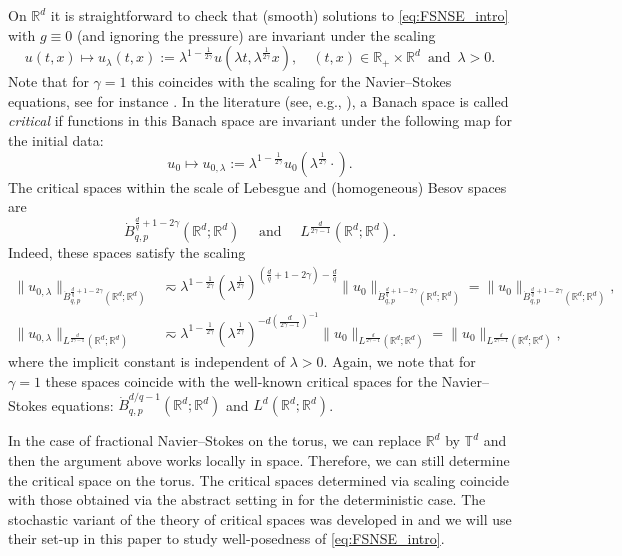\documentclass[11pt, a4paper,oneside, reqno]{amsart}
\theoremstyle{remark} %
\theoremstyle{definition} %
\numberwithin{theorem}{section}
\numberwithin{equation}{section}
\newcommand{\T}{\mathbb{T}}
\newcommand{\RR}{\mathbb{R}}
\newcommand{\RRd}{\RR^d}
\newcommand{\gam}{\gamma}
\begin{document}
On $\RR^d$ it is straightforward to check that (smooth) solutions to \eqref{eq:FSNSE_intro} with $g\equiv 0$ (and ignoring the pressure) are invariant under the scaling
\begin{equation*}
    u(t,x) \mapsto u_\lambda(t,x):= \lambda^{1-\frac{1}{2\gam}}u(\lambda t, \lambda^{\frac{1}{2\gam}}x), \quad (t,x)\in \RR_+\times \RR^d\, \text{ and }\, \lambda>0.
\end{equation*}
Note that for $\gam=1$ this coincides with the scaling for the Navier--Stokes equations, see for instance \cite{AV24_SNSE, PW18}. In the literature (see, e.g., \cite{AV25_survey, LR16, PW18, Tr13}), a Banach space is called \emph{critical} if functions in this Banach space are invariant under the following map for the initial data:
\begin{equation*}
   u_0\mapsto u_{0,\lambda} := \lambda^{1-\frac{1}{2\gam}}u_0(\lambda^{\frac{1}{2\gam}}\cdot).
\end{equation*}
The critical spaces within the scale of Lebesgue and (homogeneous) Besov spaces are
\begin{equation*}
    \dot{B}_{q,p}^{\frac{d}{q}+1-2\gam}(\RRd;\RRd)\quad \text{ and }\quad L^{\frac{d}{2\gam-1}}(\RRd;\RRd).
\end{equation*}
Indeed, these spaces satisfy the scaling
\begin{align*}
    \|u_{0,\lambda}\|_{\dot{B}_{q,p}^{\frac{d}{q}+1-2\gam}(\RRd;\RRd)}&\eqsim\lambda^{1-\frac{1}{2\gam}}(\lambda^{\frac{1}{2\gam}})^{(\frac{d}{q}+1-2\gam)-\frac{d}{q}}\|u_0\|_{\dot{B}_{q,p}^{\frac{d}{q}+1-2\gam}(\RRd;\RRd)} = \|u_0\|_{\dot{B}_{q,p}^{\frac{d}{q}+1-2\gam}(\RRd;\RRd)},\\
     \|u_{0,\lambda}\|_{L^{\frac{d}{2\gam-1}}(\RRd;\RRd)}&\eqsim \lambda^{1-\frac{1}{2\gam}} (\lambda^{\frac{1}{2\gam}})^{-d (\frac{d}{2\gam-1})^{-1}}\|u_0\|_{L^{\frac{d}{2\gam-1}}(\RRd;\RRd)} = \|u_0\|_{L^{\frac{d}{2\gam-1}}(\RRd;\RRd)},
\end{align*}
where the implicit constant is independent of $\lambda>0$. Again, we note that for $\gam=1$ these spaces coincide with the well-known critical spaces for the Navier--Stokes equations: $\dot{B}_{q,p}^{d/q-1}(\RRd;\RRd)$ and $L^d(\RRd;\RRd)$.

In the case of fractional Navier--Stokes on the torus, we can replace $\RRd$ by $\T^d$ and then the argument above works locally in space. Therefore, we can still determine the critical space on the torus. The critical spaces determined via scaling coincide with those obtained via the abstract setting in \cite{PSW18, PW18} for the deterministic case. The stochastic variant of the theory of critical spaces was developed in \cite{AV22, AV22_part2} and we will use their set-up in this paper to study well-posedness of \eqref{eq:FSNSE_intro}.
\end{document}
